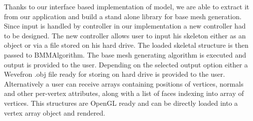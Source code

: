Thanks to our interface based implementation of model, we are able to extract it from our application and build a stand alone library for base mesh generation.
Since input is handled by controller in our implementation a new controller had to be designed.
The new controller allows user to input his skeleton either as an object or via a file stored on his hard drive.
The loaded skeletal structure is then passed to BMMAlgorithm.
The base mesh generating algorithm is executed and output is provided to the user.
Depending on the selected output option either a Wevefron .obj file ready for storing on hard drive is provided to the user.
Alternatively a user can receive arrays containing positions of vertices, normals and other per-vertex attributes, along with a list of faces indexing into array of vertices.
This structures are OpenGL ready and can be directly loaded into a vertex array object and rendered.